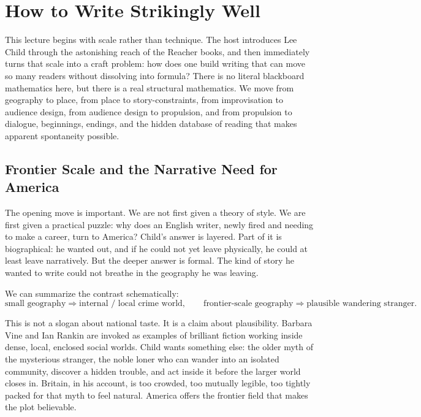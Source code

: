 \chapter{How to Write Strikingly Well}

This lecture begins with scale rather than technique. The host introduces Lee Child through the astonishing reach of the Reacher books, and then immediately turns that scale into a craft problem: how does one build writing that can move so many readers without dissolving into formula? There is no literal blackboard mathematics here, but there is a real structural mathematics. We move from geography to place, from place to story-constraints, from improvisation to audience design, from audience design to propulsion, and from propulsion to dialogue, beginnings, endings, and the hidden database of reading that makes apparent spontaneity possible.

\section{Frontier Scale and the Narrative Need for America}

The opening move is important. We are not first given a theory of style. We are first given a practical puzzle: why does an English writer, newly fired and needing to make a career, turn to America? Child's answer is layered. Part of it is biographical: he wanted out, and if he could not yet leave physically, he could at least leave narratively. But the deeper answer is formal. The kind of story he wanted to write could not breathe in the geography he was leaving.

We can summarize the contrast schematically:
\begin{equation}
\text{small geography} \Longrightarrow \text{internal / local crime world}, \qquad
\text{frontier-scale geography} \Longrightarrow \text{plausible wandering stranger}.
\end{equation}

This is not a slogan about national taste. It is a claim about plausibility. Barbara Vine and Ian Rankin are invoked as examples of brilliant fiction working inside dense, local, enclosed social worlds. Child wants something else: the older myth of the mysterious stranger, the noble loner who can wander into an isolated community, discover a hidden trouble, and act inside it before the larger world closes in. Britain, in his account, is too crowded, too mutually legible, too tightly packed for that myth to feel natural. America offers the frontier field that makes the plot believable.

